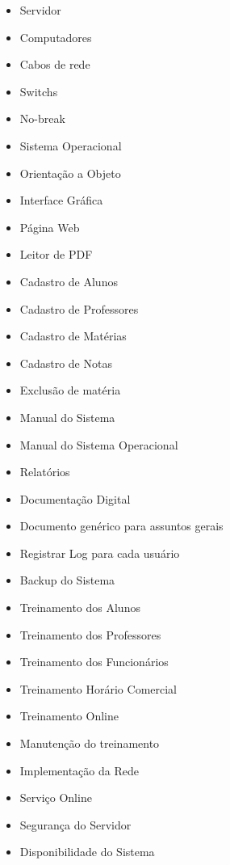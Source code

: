   \begin{itemize}
      \item Servidor
      \item Computadores
      \item Cabos de rede
      \item Switchs
      \item No-break
      \item Sistema Operacional
      \item Orientação a Objeto
      \item Interface Gráfica
      \item Página Web
      \item Leitor de PDF
      \item Cadastro de Alunos
      \item Cadastro de Professores
      \item Cadastro de Matérias
      \item Cadastro de Notas
      \item Exclusão de matéria
      \item Manual do Sistema
      \item Manual do Sistema Operacional
      \item Relatórios
      \item Documentação Digital
      \item Documento genérico para assuntos gerais
      \item Registrar Log para cada usuário
      \item Backup do Sistema
      \item Treinamento dos Alunos
      \item Treinamento dos Professores
      \item Treinamento dos Funcionários
      \item Treinamento Horário Comercial
      \item Treinamento Online
      \item Manutenção do treinamento
      \item Implementação da Rede
      \item Serviço Online
      \item Segurança do Servidor
      \item Disponibilidade do Sistema
  \end{itemize}
  
